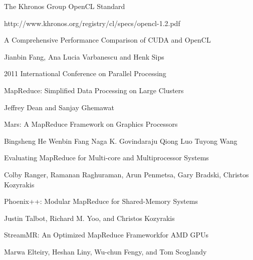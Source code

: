 \documentclass[11pt,a4paper,twocolumn] {scrartcl}   %
\begin{document}
\maketitle
{}

\pagebreak{}



\pagebreak{}


\begin{thebibliography}{9}

\thispagestyle{empty}
\pagestyle{empty}
    The Khronos Group OpenCL Standard

    http://www.khronos.org/registry/cl/specs/opencl-1.2.pdf

    A Comprehensive Performance Comparison of
    CUDA and OpenCL

    Jianbin Fang, Ana Lucia Varbanescu and Henk Sips

    2011 International Conference on Parallel Processing

    MapReduce: Simplified Data Processing on Large Clusters

    Jeffrey Dean and Sanjay Ghemawat

  Mars: A MapReduce Framework on Graphics Processors

  Bingsheng He Wenbin Fang Naga K. Govindaraju Qiong Luo Tuyong Wang

  Evaluating MapReduce for Multi-core and Multiprocessor Systems

  Colby Ranger, Ramanan Raghuraman, Arun Penmetsa, Gary Bradski, Christos Kozyrakis

    Phoenix++: Modular MapReduce for Shared-Memory Systems

    Justin Talbot, Richard M. Yoo, and Christos Kozyrakis

    StreamMR: An Optimized MapReduce Frameworkfor AMD GPUs

    Marwa Elteiry, Heshan Liny, Wu-chun Fengy, and Tom Scoglandy

\thispagestyle{empty}
\pagestyle{empty}
\end{thebibliography}
\end{document}
